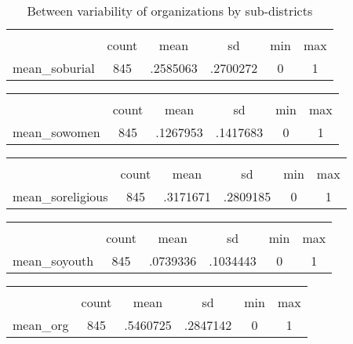 \begin{table}[htbp]\centering
\def\sym#1{\ifmmode^{#1}\else\(^{#1}\)\fi}
\caption{Between variability of organizations by sub-districts \label{tab1}}
\begin{tabular}{l*{1}{ccccc}}
\hline\hline
            &\multicolumn{5}{c}{}                                            \\
            &       count&        mean&          sd&         min&         max\\
\hline
mean\_soburial&         845&    .2585063&    .2700272&           0&           1\\
\hline\hline
\end{tabular}
\end{table}
{
\def\sym#1{\ifmmode^{#1}\else\(^{#1}\)\fi}
\begin{tabular}{l*{1}{ccccc}}
\hline\hline
            &\multicolumn{5}{c}{}                                            \\
            &       count&        mean&          sd&         min&         max\\
\hline
mean\_sowomen&         845&    .1267953&    .1417683&           0&           1\\
\hline\hline
\end{tabular}
}
{
\def\sym#1{\ifmmode^{#1}\else\(^{#1}\)\fi}
\begin{tabular}{l*{1}{ccccc}}
\hline\hline
            &\multicolumn{5}{c}{}                                            \\
            &       count&        mean&          sd&         min&         max\\
\hline
mean\_soreligious&         845&    .3171671&    .2809185&           0&           1\\
\hline\hline
\end{tabular}
}
{
\def\sym#1{\ifmmode^{#1}\else\(^{#1}\)\fi}
\begin{tabular}{l*{1}{ccccc}}
\hline\hline
            &\multicolumn{5}{c}{}                                            \\
            &       count&        mean&          sd&         min&         max\\
\hline
mean\_soyouth&         845&    .0739336&    .1034443&           0&           1\\
\hline\hline
\end{tabular}
}
{
\def\sym#1{\ifmmode^{#1}\else\(^{#1}\)\fi}
\begin{tabular}{l*{1}{ccccc}}
\hline\hline
            &\multicolumn{5}{c}{}                                            \\
            &       count&        mean&          sd&         min&         max\\
\hline
mean\_org    &         845&    .5460725&    .2847142&           0&           1\\
\hline\hline
\end{tabular}
}
